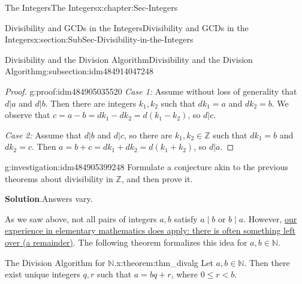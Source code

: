 \documentclass[oneside,10pt,]{book}
\newcommand{\blocktitlefont}{\relax}
\numberwithin{equation}{section}
\renewcommand{\le}{\leqslant}
\def\Z{{\mathbb Z}}
\def\N{{\mathbb N}}
\newcommand{\lt}{<}
\begin{document}
\begin{chapterptx}{The Integers}{}{The Integers}{}{}{x:chapter:Sec-Integers}
\begin{sectionptx}{Divisibility and GCDs in the Integers}{}{Divisibility and GCDs in the Integers}{}{}{x:section:SubSec-Divisibility-in-the-Integers}
\begin{subsectionptx}{Divisibility and the Division Algorithm}{}{Divisibility and the Division Algorithm}{}{}{g:subsection:idm484914047248}
\begin{proof}{}{g:proof:idm484905035520}
\emph{Case 1:} Assume without loss of generality that \(d|a\) and \(d|b\). Then there are integers \(k_1, k_2\) such that \(d k_1 = a\) and \(d k_2 = b\). We observe that \(c = a - b = d k_1 - d k_2 = d(k_1 - k_2)\), so \(d|c\).%
\par
\emph{Case 2:} Assume that \(d| b\) and \(d|c\), so there are \(k_1,k_2\in \Z\) such that \(d k_1 = b\) and \(d k_2 = c\). Then \(a = b+ c = dk_1 + dk_2 = d(k_1 + k_2)\), so \(d|a\).%
\end{proof}
\begin{investigation}{}{g:investigation:idm484905399248}%
Formulate a conjecture akin to the previous theorems about divisibility in \(\Z\), and then prove it.%
\par\smallskip%
\noindent\textbf{\blocktitlefont Solution}.\hypertarget{g:solution:idm484914214784}{}\quad{}Answers vary.%
\end{investigation}
As we saw above, not all pairs of integers \(a,b\) satisfy \(a\mid b\) or \(b\mid a\). However, \href{http://www.corestandards.org/Math/Content/4/NBT/B/6/}{our experience in elementary mathematics does apply: there is often something left over (a remainder)}. The following theorem formalizes this idea for \(a,b\in \N\).%
\begin{theorem}{The Division Algorithm for \(\N\).}{}{x:theorem:thm_divalg}%
\index{Division Algorithm (\(\N\))}%
Let \(a,b\in \N\). Then there exist unique integers \(q,r\) such that \(a = bq + r\), where \(0 \le r \lt b\).%


\end{theorem}
\end{subsectionptx}
\end{sectionptx}
\end{chapterptx}
\end{document}
